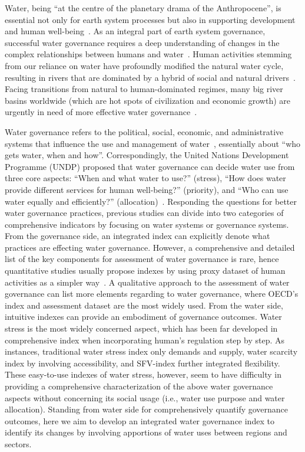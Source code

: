 
Water, being ``at the centre of the planetary drama of the Anthropocene'', is essential not only for earth system processes but also in supporting development and human well-being~\cite{gleeson2020a,gleeson2020b}.
As an integral part of earth system governance, successful water governance requires a deep understanding of changes in the complex relationships between humans and water~\cite{ahlstrom2021,biermann2012,steffen2020}.
Human activities stemming from our reliance on water have profoundly modified the natural water cycle, resulting in rivers that are dominated by a hybrid of social and natural drivers~\cite{sivapalan2012,qin2014a,abbott2019}.
Facing transitions from natural to human-dominated regimes, many big river basins worldwide (which are hot spots of civilization and economic growth) are urgently in need of more effective water governance~\cite{best2019,dibaldassarre2019}.

Water governance refers to the political, social, economic, and administrative systems that influence the use and management of water~\cite{oecd2018, wang2017}, essentially about ``who gets water, when and how''\cite{lasswell2018,allan2001}.
Correspondingly, the United Nations Development Programme (UNDP) proposed that water governance can decide water use from three core aspects: ``When and what water to use?'' (stress), ``How does water provide different services for human well-being?'' (priority), and ``Who can use water equally and efficiently?'' (allocation)~\cite{mariajacobson2013}.
Responding the questions for better water governance practices, previous studies can divide into two categories of comprehensive indicators by focusing on water systems or governance systems.
From the governance side, an integrated index can explicitly denote what practices are effecting water governance.
However, a comprehensive and detailed list of the key components for assessment of water governance is rare, hence quantitative studies usually propose indexes by using proxy dataset of human activities as a simpler way~\cite{varis2019}.
A qualitative approach to the assessment of water governance can list more elements regarding to water governance, where OECD's index and assessment dataset are the most widely used. %
From the water side, intuitive indexes can provide an embodiment of governance outcomes.
Water stress is the most widely concerned aspect, which has been far developed in comprehensive index when incorporating human's regulation step by step.
As instances, traditional water stress index only demands and supply, water scarcity index by involving accessibility, and SFV-index further integrated flexibility.
These easy-to-use indexes of water stress, however, seem to have difficulty in providing a comprehensive characterization of the above water governance aspects without concerning its social usage (i.e., water use purpose and water allocation).
Standing from water side for comprehensively quantify governance outcomes, here we aim to develop an integrated water governance index to identify its changes by involving apportions of water uses between regions and sectors.

